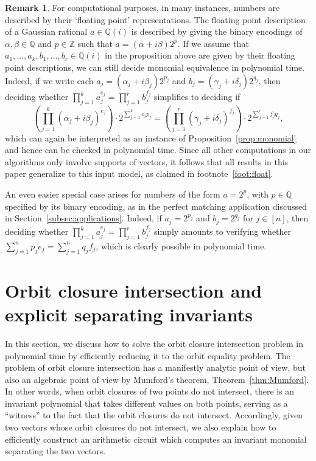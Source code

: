 \documentclass[10pt,a4paper]{article}
\theoremstyle{definition}
\newtheorem{remark}[theorem]{Remark}
\numberwithin{equation}{section}
\newcommand{\QQ}{\mathbb{Q}}
\newcommand{\ZZ}{\mathbb{Z}}
\begin{document}
\begin{remark}\label{rem:float}
For computational purposes, in many instances, numbers are described by their `floating point' representations.
The floating point description of a Gaussian rational $a \in \QQ(i)$ is described by giving the binary encodings of $\alpha,\beta \in \QQ$ and $p \in \ZZ$ such that $a = (\alpha+ i \beta) 2^p$.
If we assume that $a_1,\dots,a_k,b_1,\dots,b_r\in \QQ(i)$ in the proposition above are given by their floating point descriptions, we can still decide monomial equivalence in polynomial time.
Indeed, if we write each $a_j = (\alpha_j + i \beta_j) 2^{p_j}$ and $b_j = (\gamma_j + i \delta_j) 2^{q_j}$, then deciding whether $\prod_{j=1}^k a_j^{e_j} = \prod_{j=1}^r b_j^{f_j}$ simplifies to deciding if
\[
\left(\prod_{j=1}^k (\alpha_j + i \beta_j)^{e_j} \right) \cdot 2^{\sum_{j=1}^k e_j p_j} = \left(\prod_{j=1}^r (\gamma_j + i \delta_j)^{f_j}\right) \cdot 2^{\sum_{j=1}^r f_j q_j},
\]
which can again be interpreted as an instance of Proposition~\ref{prop:monomial} and hence can be checked in polynomial time.
Since all other computations in our algorithms only involve supports of vectors, it follows that all results in this paper generalize to this input model, as claimed in footnote~\ref{foot:float}.

An even easier special case arises for numbers of the form $a=2^p$, with $p\in\QQ$ specified by its binary encoding, as in the perfect matching application discussed in Section~\ref{subsec:applications}.
Indeed, if $a_j = 2^{p_j}$ and $b_j = 2^{q_j}$ for $j\in[n]$, then deciding whether $\prod_{j=1}^k a_j^{e_j} = \prod_{j=1}^r b_j^{f_j}$ simply amounts to verifying whether $\sum_{j=1}^n p_j e_j = \sum_{j=1}^n q_j f_j$, which is clearly possible in polynomial time.
\end{remark}


%
\section{Orbit closure intersection and explicit separating invariants}\label{sec:oci-to-oe}
%
In this section, we discuss how to solve the orbit closure intersection problem in polynomial time by efficiently reducing it to the orbit equality problem.
The problem of orbit closure intersection has a manifestly analytic point of view, but also an algebraic point of view by Mumford's theorem, Theorem~\ref{thm:Mumford}.
In other words, when orbit closures of two points do not intersect, there is an invariant polynomial that takes different values on both points, serving as a ``witness'' to the fact that the orbit closures do not intersect.
Accordingly, given two vectors whose orbit closures do not intersect, we also explain how to efficiently construct an arithmetic circuit which computes an invariant monomial separating the two vectors.
\end{document}
